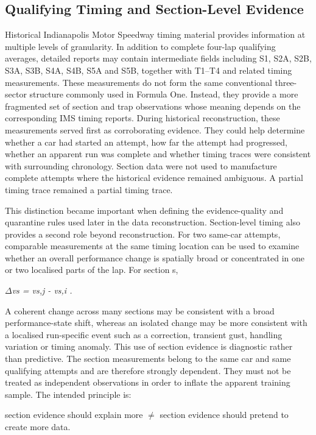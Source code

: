 \subsection{Qualifying Timing and Section-Level Evidence}
Historical Indianapolis Motor Speedway timing material provides information at multiple levels of granularity. In addition to complete four-lap qualifying averages, detailed reports may contain intermediate fields including S1, S2A, S2B, S3A, S3B, S4A, S4B, S5A and S5B, together with T1--T4 and related timing measurements. These measurements do not form the same conventional three-sector structure commonly used in Formula One. Instead, they provide a more fragmented set of section and trap observations whose meaning depends on the corresponding IMS timing reports. During historical reconstruction, these measurements served first as corroborating evidence. They could help determine whether a car had started an attempt, how far the attempt had progressed, whether an apparent run was complete and whether timing traces were consistent with surrounding chronology. Section data were not used to manufacture complete attempts where the historical evidence remained ambiguous. A partial timing trace remained a partial timing trace.

This distinction became important when defining the evidence-quality and quarantine rules used later in the data reconstruction. Section-level timing also provides a second role beyond reconstruction. For two same-car attempts, comparable measurements at the same timing location can be used to examine whether an overall performance change is spatially broad or concentrated in one or two localised parts of the lap. For section s,

\begin{center}\textit{\ensuremath{\Delta}vs = vs,j - vs,i .}\end{center}

A coherent change across many sections may be consistent with a broad performance-state shift, whereas an isolated change may be more consistent with a localised run-specific event such as a correction, transient gust, handling variation or timing anomaly. This use of section evidence is diagnostic rather than predictive. The section measurements belong to the same car and same qualifying attempts and are therefore strongly dependent. They must not be treated as independent observations in order to inflate the apparent training sample. The intended principle is:

section evidence should explain more \ensuremath{\neq} section evidence should pretend to create more data.

